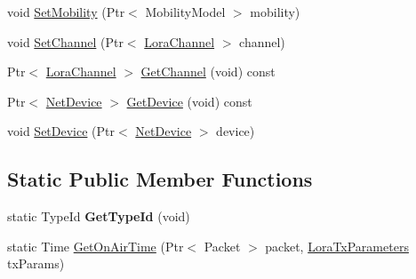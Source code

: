 \begin{DoxyCompactItemize}
void \hyperlink{classns3_1_1lorawan_1_1LoraPhy_a72179baf58ace833ad19f2f32e8d8635}{Set\+Mobility} (Ptr$<$ Mobility\+Model $>$ mobility)
\item 
void \hyperlink{classns3_1_1lorawan_1_1LoraPhy_ac74c8551858eda9ae96dc64ae94f66bb}{Set\+Channel} (Ptr$<$ \hyperlink{classns3_1_1lorawan_1_1LoraChannel}{Lora\+Channel} $>$ channel)
\item 
Ptr$<$ \hyperlink{classns3_1_1lorawan_1_1LoraChannel}{Lora\+Channel} $>$ \hyperlink{classns3_1_1lorawan_1_1LoraPhy_a8f6df296dcad3d8b74eb3682625663d2}{Get\+Channel} (void) const
\item 
Ptr$<$ \hyperlink{classNetDevice}{Net\+Device} $>$ \hyperlink{classns3_1_1lorawan_1_1LoraPhy_a2de97ba546889dfe9fdac9deb3de77c3}{Get\+Device} (void) const
\item 
void \hyperlink{classns3_1_1lorawan_1_1LoraPhy_a75b29c13bf06d571319585871d84f873}{Set\+Device} (Ptr$<$ \hyperlink{classNetDevice}{Net\+Device} $>$ device)
\end{DoxyCompactItemize}
\subsection*{Static Public Member Functions}
\begin{DoxyCompactItemize}
\item 
\mbox{\label{classns3_1_1lorawan_1_1LoraPhy_a159b124546ee7512230e63de24409dff}} 
static Type\+Id {\bfseries Get\+Type\+Id} (void)
\item 
static Time \hyperlink{classns3_1_1lorawan_1_1LoraPhy_a305f1313d0694ab94193ac8c99f2cda6}{Get\+On\+Air\+Time} (Ptr$<$ Packet $>$ packet, \hyperlink{structns3_1_1lorawan_1_1LoraTxParameters}{Lora\+Tx\+Parameters} tx\+Params)
\end{DoxyCompactItemize}
